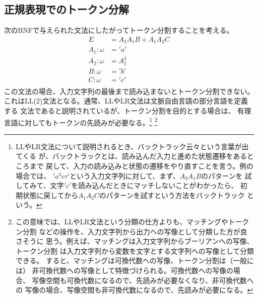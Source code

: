 {\subsection{正規表現でのトークン分解}\label{s2:正規表現でのトークン分解} %
	次のBNFで与えられた文法にしたがってトークン分割することを考える。
	\begin{equation*}\begin{split}
		E &= A_2A_1B + A_1A_2C \\
		A_1:\omega &= 'a' \\
		A_2:\omega &= A_1^2 \\
		B:\omega &= 'b' \\
		C:\omega &= 'c' \\
	\end{split}\end{equation*}
	この文法の場合、入力文字列の最後まで読み込まないとトークン分割できない。
	これはLL(2)文法となる。通常、LLやLR文法は文脈自由言語の部分言語を定義する
	文法であると説明されているが、トークン分割を目的とする場合は、
	有理言語に対してもトークンの先読みが必要なる。\footnote{
		LLやLR文法について説明されるとき、バックトラック云々という言葉が出てくる
		が、バックトラックとは、読み込んだ入力と進めた状態遷移をあるところまで
		戻して、入力の読み込みと状態の遷移をやり直すことを言う。例の場合では、
		$'a^3c\tau'$という入力文字列に対して、まず、$A_2A_1B$のパターンを
		試してみて、文字$'c'$を読み込んだときにマッチしないことがわかったら、
		初期状態に戻してから$A_1A_2C$のパターンを試すという方法をバックトラック
		という。
	} \footnote{
		この意味では、LLやLR文法という分類の仕方よりも、マッチングやトークン分割
		などの操作を、入力文字列から出力への写像として分類した方が良さそうに
		思う。例えば、マッチングは入力文字列からブーリアンへの写像、トークン分割
		は入力文字列から変数を文字とする文字列への写像として分類できる。
		すると、マッチングは可換代数への写像、トークン分割は（一般には）
		非可換代数への写像として特徴づけられる。可換代数への写像の場合、
		写像空間も可換代数になるので、先読みが必要なくなり、非可換代数への
		写像の場合、写像空間も非可換代数になるので、先読みが必要になる。
	}
}\endgroup %
